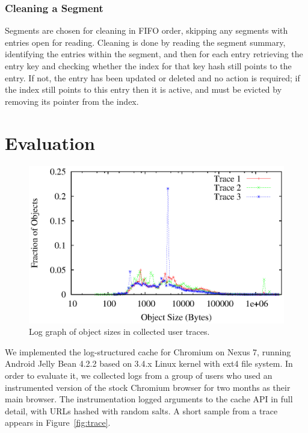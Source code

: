 \documentclass[letterpaper,twocolumn,10pt]{article}
\begin{document}
\subsubsection{Cleaning a Segment}
Segments are chosen for cleaning in FIFO order, skipping any segments with
entries open for reading. Cleaning is done by reading the segment summary,
identifying the entries within the segment, and then for each entry retrieving
the entry key and checking whether the index for that key hash still points to
the entry. If not, the entry has been updated or deleted and no action is
required; if the index still points to this entry then it is active, and must be
evicted by removing its pointer from the index.

\section{Evaluation}

\begin{figure}[t]
  \begin{center}
    \includegraphics[width=1.04\columnwidth]{graphs/log-size-dist}
  \end{center}
  \caption{Log graph of object sizes in collected user traces.}
  \label{fig:log-size-dist} 
\vspace{-0.2in}
\end{figure}

We implemented the log-structured cache for Chromium on Nexus 7, running Android
Jelly Bean 4.2.2 based on 3.4.x Linux kernel with ext4 file system.  In order to
evaluate it, we collected logs from a group of users who used an instrumented
version of the stock Chromium browser for two months as their main browser.  The
instrumentation logged arguments to the cache API in full detail, with URLs
hashed with random salts.  A short sample from a trace appears in
Figure~\ref{fig:trace}.
\end{document}
